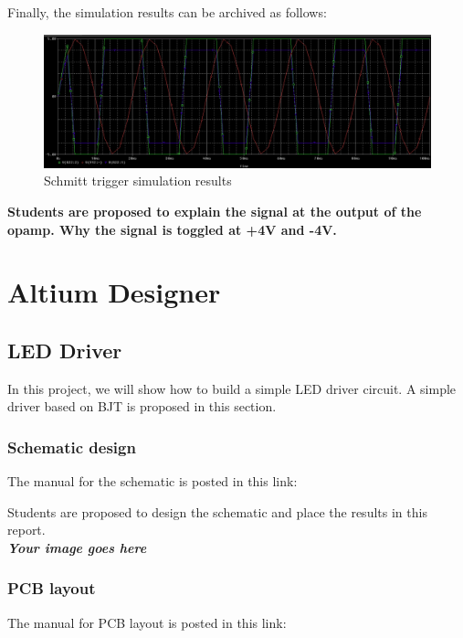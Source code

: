 Finally, the simulation results can be archived as follows:

\begin{figure}[!htp]
    \centering
    \includegraphics[width = 5.5in]{source/picture/bai_5/sTrigger5.png}
    \caption{Schmitt trigger simulation results}
    \label{lab05_low_filter5}
\end{figure}

\textbf{Students are proposed to explain the signal at the output of the opamp. Why the signal is toggled at +4V and -4V.}


\section{Altium Designer}
\subsection{LED Driver}
In this project, we will show how to build a simple LED driver circuit. A simple driver based on BJT is proposed in this section.

\subsubsection{Schematic design}
The manual for the schematic is posted in this link:

\begin{center}
\end{center}

Students are proposed to design the schematic and place the results in this report.\\

\textbf{\textit{Your image goes here}}

\subsubsection{PCB layout}
The manual for PCB layout is posted in this link:\\

